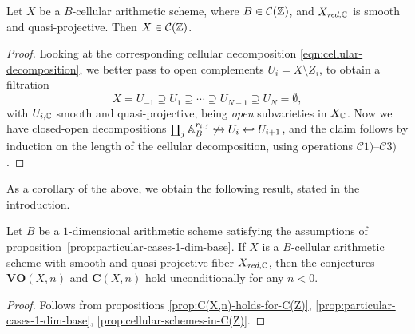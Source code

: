 \documentclass{article}
\numberwithin{equation}{section}
\begin{document}
\begin{proposition}
  \label{prop:cellular-schemes-in-C(Z)}
  Let $X$ be a $B$-cellular arithmetic scheme, where $B \in \mathcal{C} (\ZZ)$,
  and $X_{\red,\CC}$ is smooth and quasi-projective. Then
  $X \in \mathcal{C} (\ZZ)$.

  \begin{proof}
    Looking at the corresponding cellular decomposition
    \eqref{eqn:cellular-decomposition}, we better pass to open complements
    $U_i = X\setminus Z_i$, to obtain a filtration
    $$X = U_{-1} \supseteq U_1 \supseteq \cdots \supseteq U_{N-1} \supseteq U_N = \emptyset,$$
    with $U_{i,\CC}$ smooth and quasi-projective, being \emph{open}
    subvarieties in $X_\CC$. Now we have closed-open decompositions
    $\coprod_j \AA^{r_{i,j}}_B \not\hookrightarrow U_i \hookleftarrow U_{i+1}$,    
    and the claim follows by induction on the length of the cellular
    decomposition, using operations
    $\mathcal{C}1)$--$\mathcal{C}3)$.
  \end{proof}
\end{proposition}

As a corollary of the above, we obtain the following result, stated in the
introduction.

\begin{theorem}
  Let $B$ be a $1$-dimensional arithmetic scheme satisfying the assumptions of
  proposition~\ref{prop:particular-cases-1-dim-base}. If $X$ is a $B$-cellular
  arithmetic scheme with smooth and quasi-projective fiber $X_{\red,\CC}$, then
  the conjectures $\mathbf{VO} (X,n)$ and $\mathbf{C} (X,n)$ hold
  unconditionally for any $n < 0$.

  \begin{proof}
    Follows from propositions
    \ref{prop:C(X,n)-holds-for-C(Z)},
    \ref{prop:particular-cases-1-dim-base},
    \ref{prop:cellular-schemes-in-C(Z)}.
  \end{proof}
\end{theorem}


\pagebreak
\end{document}
